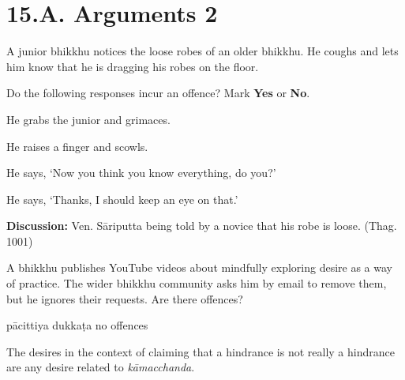 \chapter{15.A. Arguments 2}
\renewcommand*{\theChapterTitle}{15.A. Arguments 2}

\begin{exam}{\autoExamName}

  \begin{problem*}

    A junior bhikkhu notices the loose robes of an older bhikkhu.
    He coughs and lets him know that he is dragging his robes on the floor.

    \bigskip

    Do the following responses incur an offence? Mark \textbf{Yes} or \textbf{No}.

    \bigskip

      \begin{parts}

      \item {} He grabs the junior and grimaces.
      \item {} He raises a finger and scowls.
      \item {} He says, `Now you think you know everything, do you?'
      \item {} He says, `Thanks, I should keep an eye on that.'

      \end{parts}

    \bigskip

    \textbf{Discussion:} Ven. Sāriputta being told by a novice that his robe is loose. (Thag. 1001)
    
  \end{problem*}

  \problemDivide

  \begin{problem}

  A bhikkhu publishes YouTube videos about mindfully exploring desire as a way
  of practice. The wider bhikkhu community asks him by email to remove them, but
  he ignores their requests. Are there offences?

  \bigskip

  \begin{answers}{3}
    \bChoices
     pācittiya\eAns
     dukkaṭa\eAns
     no offences\eAns
    \eChoices
  \end{answers}

  \begin{solution}
    The desires in the context of claiming that a hindrance is not really a
    hindrance are any desire related to \emph{kāmacchanda}.


\end{solution}
\end{problem}
\end{exam}
